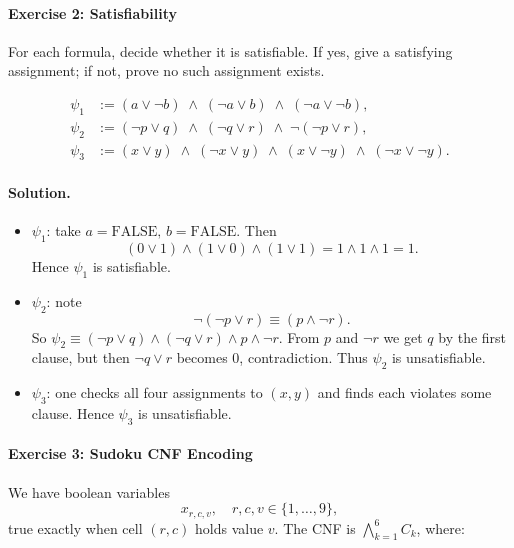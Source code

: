 \documentclass{article}
\theoremstyle{theorem}
\theoremstyle{definition}
\theoremstyle{remark}
\begin{document}
\paragraph*{Exercise 2: Satisfiability}  
For each formula, decide whether it is satisfiable.  If yes, give a satisfying
assignment; if not, prove no such assignment exists.

\[
\begin{aligned}
\psi_1 &:= (a\lor\neg b)\;\land\;(\neg a\lor b)\;\land\;(\neg a\lor\neg b),\\
\psi_2 &:= (\neg p\lor q)\;\land\;(\neg q\lor r)\;\land\;\neg(\neg p\lor r),\\
\psi_3 &:= (x\lor y)\;\land\;(\neg x\lor y)\;\land\;(x\lor\neg y)\;\land\;(\neg x\lor\neg y).
\end{aligned}
\]

\paragraph{Solution.}
\begin{itemize}
  \item \(\psi_1\): take \(a=\mathrm{FALSE},\,b=\mathrm{FALSE}\).  Then
  \[
    (0\lor1)\land(1\lor0)\land(1\lor1)
    =1\land1\land1=1.
  \]
  Hence \(\psi_1\) is satisfiable.

  \item \(\psi_2\): note
  \[
    \neg(\neg p\lor r)\equiv(p\land\neg r).
  \]
  So \(\psi_2\equiv(\neg p\lor q)\land(\neg q\lor r)\land p\land\neg r\).
  From \(p\) and \(\neg r\) we get \(q\) by the first clause, but then
  \(\neg q\lor r\) becomes \(0\), contradiction.  Thus \(\psi_2\) is
  unsatisfiable.

  \item \(\psi_3\): one checks all four assignments to \((x,y)\) and finds
  each violates some clause.  Hence \(\psi_3\) is unsatisfiable.
\end{itemize}

\paragraph*{Exercise 3: Sudoku CNF Encoding}  
We have boolean variables
\[
  x_{r,c,v},\quad
  r,c,v\in\{1,\dots,9\},
\]
true exactly when cell \((r,c)\) holds value \(v\).  The CNF is
\(\bigwedge_{k=1}^6 C_k\), where:
\end{document}
